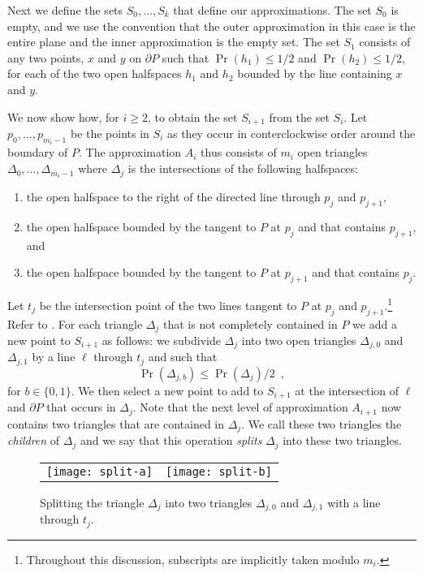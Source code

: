 \documentclass[charterfonts,lotsofwhite]{patmorin}
\newcommand{\boundary}{\partial}
\begin{document}
Next we define the sets $S_0,\ldots,S_k$ that define our
approximations.  The set $S_0$ is empty, and we use the convention
that the outer approximation in this case is the entire plane and the
inner approximation is the empty set. The set $S_1$ consists of any two
points, $x$ and $y$ on $\boundary P$ such that $\Pr(h_1)\le 1/2$ and
$\Pr(h_2)\le 1/2$, for each of the two open halfspaces $h_1$ and $h_2$
bounded by the line containing $x$ and $y$.

We now show how, for $i\ge 2$, to obtain the set $S_{i+1}$ from the
set $S_{i}$.  Let $p_0,\ldots,p_{m_i-1}$ be the points in $S_i$ as
they occur in conterclockwise order around the boundary of $P$.  The
approximation $A_i$ thus consists of $m_i$ open triangles
$\Delta_0,\ldots,\Delta_{m_i-1}$ where $\Delta_j$ is the intersections
of the following halfspaces:

\begin{enumerate}
\item the open halfspace to the right of the directed line through 
	$p_j$ and $p_{j+1}$,
\item the open halfspace bounded by the tangent to $P$ at $p_j$ and that
contains $p_{j+1}$, and 
\item the open halfspace bounded by the tangent to $P$ at $p_{j+1}$ and
that contains $p_j$.
\end{enumerate}
Let $t_j$ be the intersection point of 
the two lines tangent to $P$ at $p_j$ and
$p_{j+1}$.\footnote{Throughout this discussion, subscripts are
implicitly taken modulo $m_i$.}  Refer to . For each
triangle $\Delta_j$ that is not completely contained in $P$
we add a new point to
$S_{i+1}$ as follows:  we subdivide $\Delta_j$ into two open triangles
$\Delta_{j,0}$ and $\Delta_{j,1}$ by a line $\ell$ through $t_j$ and
such that 
\[  
     \Pr(\Delta_{j,b}) \le \Pr(\Delta_{j})/2 \enspace ,
\]
for $b\in\{0,1\}$.
We then select a new point to add to $S_{i+1}$ at the intersection of
$\ell$ and $\boundary P$ that occurs in $\Delta_j$.  Note that the
next level of approximation $A_{i+1}$ now contains two triangles that
are contained in $\Delta_j$.  We call these two triangles the
\emph{children} of $\Delta_j$ and we say that this operation
\emph{splits} $\Delta_j$ into these two triangles.

\begin{figure}
\begin{center}
\begin{tabular}{cc}
\texttt{[image: split-a]} & \texttt{[image: split-b]}
\end{tabular}
\end{center}
\caption{Splitting the triangle $\Delta_j$ into two triangles
$\Delta_{j,0}$ and $\Delta_{j,1}$ with a line through $t_j$.}
\end{figure}
\end{document}
